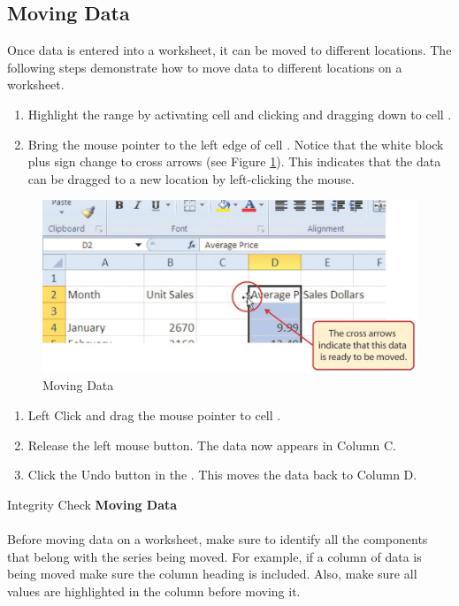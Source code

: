 \subsection{Moving Data}

Once data is entered into a worksheet, it can be moved to different locations. The following steps demonstrate how to move data to different locations on a worksheet.

\begin{enumerate}
	\item Highlight the range  by activating cell  and clicking and dragging down to cell .
	\item Bring the mouse pointer to the left edge of cell . Notice that the white block plus sign change to cross arrows (see Figure \ref{01:fig30}). This indicates that the data can be dragged to a new location by left-clicking the mouse.
\end{enumerate}

\begin{figure}[H]
	\centering
	\includegraphics[width=\maxwidth{.95\linewidth}]{gfx/ch01_fig30}
	\caption{Moving Data}
	\label{01:fig30}
\end{figure}

\begin{enumerate}[resume]
	\item Left Click and drag the mouse pointer to cell .
	\item Release the left mouse button. The data now appears in Column C.
	\item Click the Undo button in the . This moves the data back to Column D.
\end{enumerate}

\begin{center}
	\begin{infobox}{Integrity Check}
		\textbf{Moving Data}
		\\
		\\
		Before moving data on a worksheet, make sure to identify all the components that belong with the series being moved. For example, if a column of data is being moved make sure the column heading is included. Also, make sure all values are highlighted in the column before moving it.
	\end{infobox}
\end{center}


